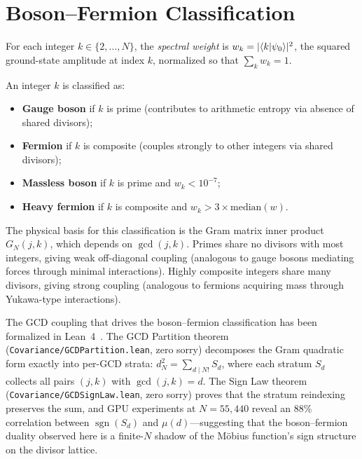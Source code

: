 \documentclass[11pt,a4paper]{article}
\begin{document}
\section{Boson--Fermion Classification}
\label{sec:classification}

\begin{definition}
For each integer $k \in \{2, \ldots, N\}$, the \emph{spectral weight}
is $w_k = |\langle k | \psi_0 \rangle|^2$, the squared ground-state amplitude
at index $k$, normalized so that $\sum_k w_k = 1$.
\end{definition}

\begin{definition}
An integer $k$ is classified as:
\begin{itemize}
  \item \textbf{Gauge boson} if $k$ is prime (contributes to arithmetic
    entropy via absence of shared divisors);
  \item \textbf{Fermion} if $k$ is composite (couples strongly to other
    integers via shared divisors);
  \item \textbf{Massless boson} if $k$ is prime and $w_k < 10^{-7}$;
  \item \textbf{Heavy fermion} if $k$ is composite and $w_k > 3 \times
    \text{median}(w)$.
\end{itemize}
\end{definition}

The physical basis for this classification is the Gram matrix inner
product $G_N(j,k)$, which depends on $\gcd(j,k)$. Primes share no
divisors with most integers, giving weak off-diagonal coupling
(analogous to gauge bosons mediating forces through minimal
interactions). Highly composite integers share many divisors, giving
strong coupling (analogous to fermions acquiring mass through
Yukawa-type interactions).

\begin{remark}
The GCD coupling that drives the boson--fermion classification has been
formalized in Lean~4~\cite{cathedral-physics}. The GCD Partition theorem
(\texttt{Covariance/GCDPartition.lean}, zero sorry) decomposes the
Gram quadratic form exactly into per-GCD strata:
$d_N^2 = \sum_{d \mid N!} S_d$,
where each stratum $S_d$ collects all pairs $(j,k)$ with $\gcd(j,k) = d$.
The Sign Law theorem (\texttt{Covariance/GCDSignLaw.lean}, zero sorry)
proves that the stratum reindexing preserves the sum, and GPU experiments
at $N = 55{,}440$ reveal an 88\% correlation between
$\operatorname{sgn}(S_d)$ and $\mu(d)$---suggesting that the
boson--fermion duality observed here is a finite-$N$ shadow of the
M\"obius function's sign structure on the divisor lattice.
\end{remark}
\end{document}

